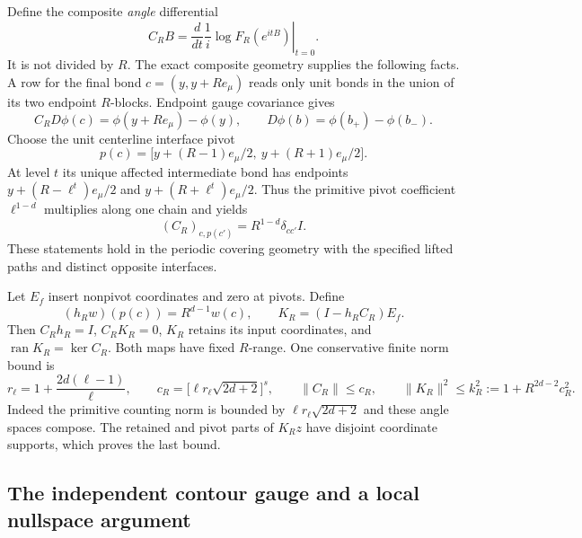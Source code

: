 Define the composite \emph{angle} differential
\begin{equation}
 C_RB=\left.\frac{d}{dt}\frac1i
            \log F_R(e^{itB})\right|_{t=0}.
 \label{cmq-constraint}
\end{equation}
It is not divided by $R$. The exact composite geometry supplies
the following facts. A row for the final bond $c=(y,y+Re_\mu)$
reads only unit bonds in the union of its two endpoint $R$-blocks.
Endpoint gauge covariance gives
\begin{equation}
 C_RD\phi(c)=\phi(y+Re_\mu)-\phi(y),
 \qquad D\phi(b)=\phi(b_+)-\phi(b_-).
 \label{cmq-gradient}
\end{equation}
Choose the unit centerline interface pivot
\begin{equation}
 p(c)=\big[y+(R-1)e_\mu/2,\ y+(R+1)e_\mu/2\big].
 \label{cmq-pivot}
\end{equation}
At level $t$ its unique affected intermediate bond has endpoints
$y+(R-\ell^t)e_\mu/2$ and $y+(R+\ell^t)e_\mu/2$.
Thus the primitive pivot coefficient $\ell^{1-d}$ multiplies
along one chain and yields
\begin{equation}
 (C_R)_{c,p(c')}=R^{1-d}\delta_{cc'}I.
 \label{cmq-pivot-coefficient}
\end{equation}
These statements hold in the periodic covering geometry with
the specified lifted paths and distinct opposite interfaces.

Let $E_f$ insert nonpivot coordinates and zero at pivots. Define
\begin{equation}
 (h_Rw)(p(c))=R^{d-1}w(c),\qquad
 K_R=(I-h_RC_R)E_f.
 \label{cmq-retained-map}
\end{equation}
Then $C_Rh_R=I$, $C_RK_R=0$, $K_R$ retains its input coordinates,
and $\operatorname{ran}K_R=\ker C_R$. Both maps have fixed
$R$-range. One conservative finite norm bound is
\begin{equation}
 r_\ell=1+\frac{2d(\ell-1)}\ell,\qquad
 c_R=\big[\ell r_\ell\sqrt{2d+2}\big]^s,\qquad
 \|C_R\|\leq c_R,\qquad
 \|K_R\|^2\leq k_R^2:=1+R^{2d-2}c_R^2.
 \label{cmq-retained-upper}
\end{equation}
Indeed the primitive counting norm is bounded by
$\ell r_\ell\sqrt{2d+2}$ and these angle spaces compose.
The retained and pivot parts of $K_Rz$ have disjoint coordinate
supports, which proves the last bound.

\subsection{The independent contour gauge and a local nullspace argument}
\label{cmq-patch-section}

